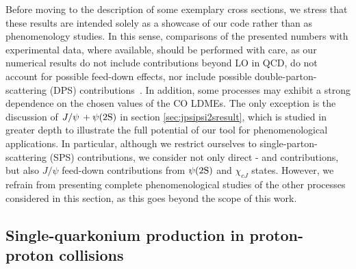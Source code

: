 Before moving to the description of some exemplary cross sections, we stress that these results are intended solely as a showcase of our code rather than as phenomenology studies.
In this sense, comparisons of the presented numbers with experimental data, where available, should be performed with care, as our numerical results do not include contributions beyond LO in QCD, do not account for possible feed-down effects, nor include possible double-parton-scattering (DPS) contributions~\cite{Kom:2011bd,Lansberg:2014swa,Lansberg:2015lva,Shao:2016wor,Lansberg:2016rcx,Lansberg:2016muq,Borschensky:2016nkv,Lansberg:2017chq,Shao:2019qob,Shao:2020kgj,Prokhorov:2020owf}. In addition, some processes may exhibit a strong dependence
on the chosen values of the CO LDMEs. The only exception is the discussion of $J/\psi\, + \psi(2\mathrm{S})$ in section \ref{sec:jpsipsi2sresult}, which is studied in greater depth to illustrate the full potential of our tool for phenomenological applications. In particular, although we restrict ourselves to single-parton-scattering (SPS) contributions, we consider not only direct \swave- and {\pwavetxt} contributions, but also $J/\psi$ feed-down contributions from $\psi(2\mathrm{S})$ and $\chi_{cJ}$ states. However, we refrain from presenting complete phenomenological studies of the other processes considered in this section, as this goes beyond the scope of this work.

\subsection{Single-quarkonium production in proton-proton collisions}


